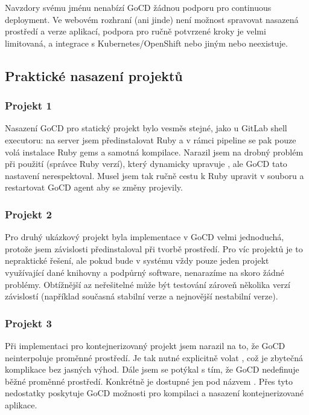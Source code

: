         Navzdory svému jménu nenabízí GoCD žádnou podporu pro continuous deployment. Ve webovém rozhraní (ani jinde) není možnost spravovat nasazená prostředí a verze aplikací, podpora pro ručně potvrzené kroky je velmi limitovaná, a integrace s Kubernetes/OpenShift nebo jiným  nebo neexistuje.

    \subsection{Praktické nasazení projektů}
        \subsubsection{Projekt 1}
            Nasazení GoCD pro statický projekt bylo vesměs stejné, jako u GitLab shell executoru: na server jsem předinstalovat Ruby a v rámci pipeline se pak pouze volá instalace Ruby gems a samotná kompilace. Narazil jsem na drobný problém při použití  (správce Ruby verzí), který dynamicky upravuje , ale GoCD tato nastavení nerespektoval. Musel jsem tak ručně cestu k Ruby upravit v souboru  a restartovat GoCD agent aby se změny projevily.

        \subsubsection{Projekt 2}
            Pro druhý ukázkový projekt byla implementace v GoCD velmi jednoduchá, protože jsem závislosti předinstaloval při tvorbě prostředí. Pro víc projektů je to nepraktické řešení, ale pokud bude v systému vždy pouze jeden projekt využívající dané knihovny a podpůrný software, nenarazíme na skoro žádné problémy. Obtížnější az neřešitelné může být testování zároveň několika verzí závislostí (například současná stabilní verze a nejnovější nestabilní verze).

        \subsubsection{Projekt 3}
            Při implementaci \CI pro kontejnerizovaný projekt jsem narazil na to, že GoCD neinterpoluje proměnné prostředí. Je tak nutné explicitně volat , což je zbytečná komplikace bez jasných výhod. Dále jsem se potýkal s tím, že GoCD nedefinuje běžné proměnné prostředí. Konkrétně  je dostupné jen pod názvem . Přes tyto nedostatky poskytuje GoCD možnosti pro kompilaci a nasazení kontejnerizované aplikace.
